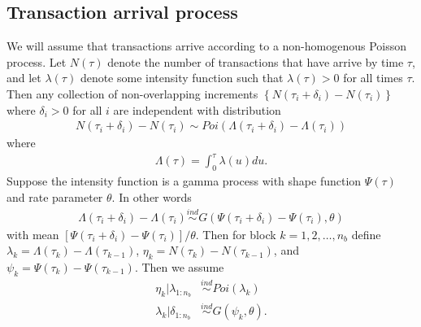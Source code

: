 \documentclass{article}
\begin{document}
\subsection{Transaction arrival process}
We will assume that transactions arrive according to a non-homogenous Poisson process. Let $N(\tau)$ denote the number of transactions that have arrive by time $\tau$, and let $\lambda(\tau)$ denote some intensity function such that $\lambda(\tau) > 0$ for all times $\tau$. Then any collection of non-overlapping increments $\left\{N(\tau_i + \delta_i) - N(\tau_i)\right\}$ where $\delta_i>0$ for all $i$ are independent with distribution
\begin{align*}
N(\tau_i + \delta_i) - N(\tau_i) \sim Poi(\Lambda(\tau_i + \delta_i) - \Lambda(\tau_i))
\end{align*}
where 
\begin{align*}
\Lambda(\tau) = \int_0^\tau \lambda(u)du.
\end{align*}
Suppose the intensity function is a gamma process with shape function $\Psi(\tau)$ and rate parameter $\theta$. In other words
\begin{align*}
\Lambda(\tau_i + \delta_i) - \Lambda(\tau_i) \stackrel{ind}{\sim} G(\Psi(\tau_i + \delta_i) - \Psi(\tau_i), \theta)
\end{align*}
with mean $[\Psi(\tau_i + \delta_i) - \Psi(\tau_i)]/\theta$. Then for block $k=1,2,\dots,n_{b}$ define $\lambda_k = \Lambda(\tau_k) - \Lambda(\tau_{k-1})$, $\eta_k = N(\tau_k) - N(\tau_{k-1})$, and $\psi_k = \Psi(\tau_k) - \Psi(\tau_{k-1})$. Then we assume
\begin{align*}
\eta_k | \lambda_{1:n_{b}} &\stackrel{ind}{\sim} Poi(\lambda_k)\\
\lambda_k|\delta_{1:n_{b}} &\stackrel{ind}{\sim} G(\psi_k, \theta).
\end{align*}
\end{document}
